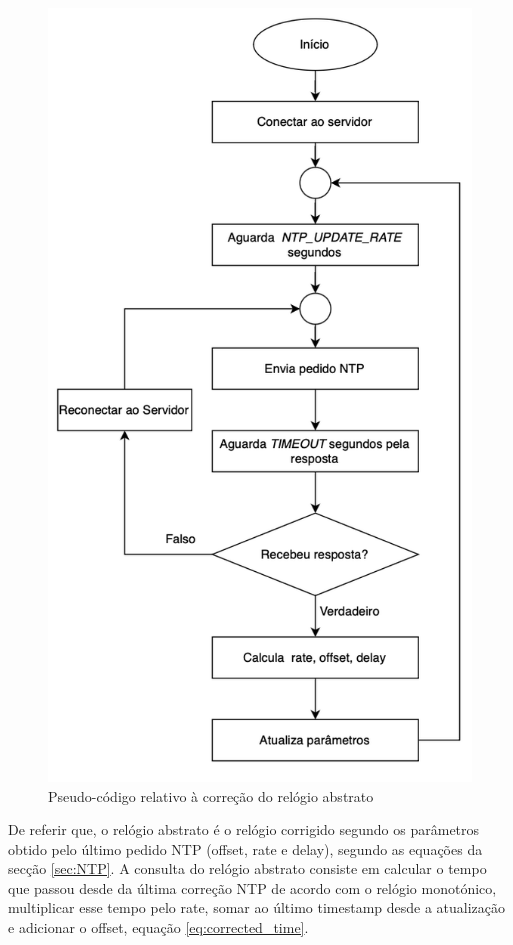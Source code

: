     \begin{figure}[h]
        \centering
        \includegraphics[width=0.6\linewidth]{figures/pseudoCodigoRelogio.png}
        \caption{Pseudo-código relativo à correção do relógio abstrato}
        \label{fig:pseudoCodigoRelogio}
    \end{figure}

    De referir que, o relógio abstrato é o relógio corrigido segundo os parâmetros obtido pelo último pedido NTP (offset, rate e delay), segundo as equações da secção \ref{sec:NTP}. A consulta do relógio abstrato consiste em calcular o tempo que passou desde da última correção NTP de acordo com o relógio monotónico, multiplicar esse tempo pelo rate, somar ao último timestamp desde a atualização e adicionar o offset, equação \ref{eq:corrected_time}.



